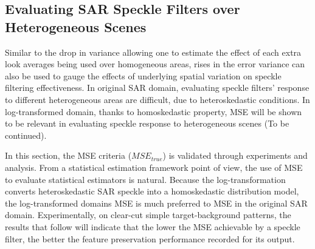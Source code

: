 
\subsection{ Evaluating SAR Speckle Filters over Heterogeneous Scenes }
\label{sec:eval_hetero}

Similar to the drop in variance allowing one to estimate the effect of each extra look averages being used over homogeneous areas, rises in the error variance can also be used to gauge the effects of underlying spatial variation on speckle filtering effectiveness. 
In original SAR domain, evaluating speckle filters' response to different heterogeneous areas are difficult, due to heteroskedastic conditions.
In log-transformed domain, thanks to homoskedastic property, MSE will be shown to be relevant in evaluating speckle response to heterogeneous scenes (To be continued).



In this section, the MSE criteria ($MSE_{true}$) is validated through experiments and analysis. 
From a statistical estimation framework point of view, the use of MSE to evaluate statistical estimators is natural.
Because the log-transformation converts heteroskedastic SAR speckle into a homoskedastic distribution model, 
	the log-transformed domains MSE is much preferred to MSE in the original SAR domain.
Experimentally, on clear-cut simple target-background patterns, the results that follow will indicate that
	the lower the MSE achievable by a speckle filter,
	the better the feature preservation performance recorded for its output.

